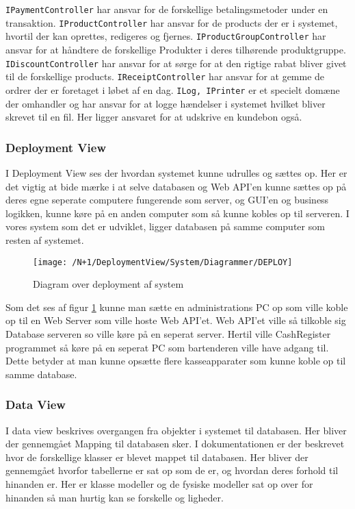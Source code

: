 \texttt{IPaymentController} har ansvar for de forskellige betalingsmetoder under en transaktion. \texttt{IProductController} har ansvar for de products der er i systemet, hvortil der kan oprettes, redigeres og fjernes. 
\texttt{IProductGroupController} har ansvar for at håndtere de forskellige Produkter i deres tilhørende produktgruppe.
\texttt{IDiscountController} har ansvar for at sørge for at den rigtige rabat bliver givet til de forskellige products.
\texttt{IReceiptController} har ansvar for at gemme de ordrer der er foretaget i løbet af en dag.
\texttt{ILog, IPrinter} er et specielt domæne der omhandler og har ansvar for at logge hændelser i systemet hvilket bliver skrevet til en fil. Her ligger ansvaret for at udskrive en kundebon også.


\subsubsection{Deployment View}
I Deployment View ses der hvordan systemet kunne udrulles og sættes op. Her er det vigtig at bide mærke i at selve databasen og \gls{Web API}'en kunne sættes op på deres egne seperate computere fungerende som server, og GUI'en og business logikken, kunne køre på en anden computer som så kunne kobles op til serveren. I vores system som det er udviklet, ligger databasen på samme computer som resten af systemet. \newline\newline
\begin{figure}[H]
	\centering
	\texttt{[image: /N+1/DeploymentView/System/Diagrammer/DEPLOY]}
	\caption{Diagram over deployment af system}
	\label{fig:DeplayDia}
\end{figure}
Som det ses af figur \ref{fig:DeplayDia} kunne man sætte en administrations PC op som ville koble op til en Web Server som ville hoste Web API'et. Web API'et ville så tilkoble sig Database serveren so  ville køre på en seperat server. Hertil ville CashRegister programmet så køre på en seperat PC som bartenderen ville have adgang til. Dette betyder at man kunne opsætte flere kasseapparater som kunne koble op til samme database.  

\subsubsection{Data View}
I data view beskrives overgangen fra objekter i systemet til databasen. Her bliver der gennemgået Mapping til databasen sker.\newline\newline
I dokumentationen er der beskrevet hvor de forskellige klasser er blevet mappet til databasen. Her bliver der gennemgået hvorfor tabellerne er sat op som de er, og hvordan deres forhold til hinanden er. Her er klasse modeller og de fysiske modeller sat op  over for hinanden så man hurtig kan se forskelle og ligheder.

